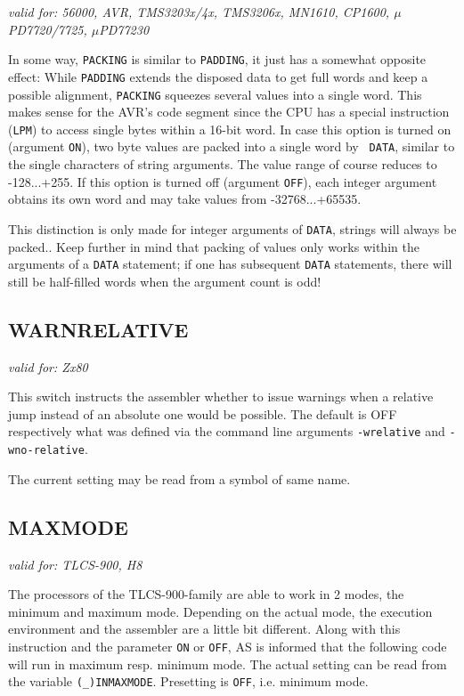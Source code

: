 \documentclass[12pt,twoside]{report}
\makeatletter
\newcommand{\tty}[1]{{\tt #1}}
\newcommand{\ttindex}[1]{\index{#1@{\tt #1}}}
\newcommand{\asname}{{AS}}
\newcommand{\predefsym}[1]{{\tt (\_)#1}}
\makeatother
\begin{document}
{\em valid for: 56000, AVR, TMS3203x/4x, TMS3206x, MN1610, CP1600,
     $\mu$PD7720/7725, $\mu$PD77230}

In some way, {\tt PACKING} is similar to {\tt PADDING}, it just has a
somewhat opposite effect: While {\tt PADDING} extends the disposed data to
get full words and keep a possible alignment, {\tt PACKING} squeezes
several values into a single word.  This makes sense for the AVR's code
segment since the CPU has a special instruction ({\tt LPM}) to access
single bytes within a 16-bit word.  In case this option is turned on
(argument {\tt ON}), two byte values are packed into a single word by {\tt
DATA}, similar to the single characters of string arguments.  The value
range of course reduces to -128...+255.  If this option is turned off
(argument {\tt OFF}), each integer argument obtains its own word and may
take values from -32768...+65535.

This distinction is only made for integer arguments of {\tt DATA}, strings
will always be packed..  Keep further in mind that packing of values only
works within the arguments of a {\tt DATA} statement; if one has
subsequent {\tt DATA} statements, there will still be half-filled words
when the argument count is odd!


\subsection{WARNRELATIVE}

{\em valid for:  Zx80}

This switch instructs the assembler whether to issue warnings when a relative jump
instead of an absolute one would be possible.  The default is OFF respectively
what was defined via the command line arguments {\tt -wrelative} and {\tt -wno-relative}.

The current setting may be read from a symbol of same name.


\subsection{MAXMODE}
\ttindex{MAXMODE}

{\em valid for: TLCS-900, H8}

The processors of the TLCS-900-family are able to work in 2 modes, the
minimum and maximum mode.  Depending on the actual mode, the execution
environment and the assembler are a little bit different. Along with this
instruction and the parameter \tty{ON} or \tty{OFF}, \asname{} is informed that the
following code will run in maximum resp. minimum mode.  The actual setting
can be read from the variable \predefsym{INMAXMODE}.  Presetting is \tty{OFF},
i.e. minimum mode.
\end{document}
